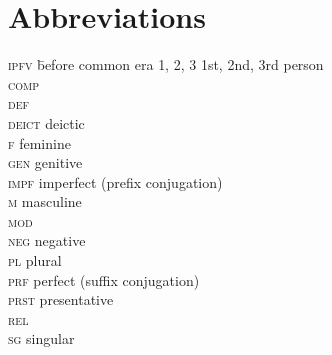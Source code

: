 \documentclass[output=paper]{langsci/langscibook}
\begin{document}
\section*{Abbreviations}
\setlength{\columnsep}{30pt}
\begin{multicols}{2}
\begin{tabbing}
\textsc{ipfv} \hspace{1em} \= before common era\kill
\textsc{1, 2, 3} \> 1st, 2nd, 3rd person \\
\textsc{comp} \>  \\
\textsc{def} \>  \\
\textsc{deict} \> deictic \\
\textsc{f} \> feminine \\
\textsc{gen} \> genitive \\
\textsc{impf} \> imperfect (prefix conjugation) \\
\textsc{m} \> masculine \\
\textsc{mod} \>  \\
\textsc{neg} \> negative \\
\textsc{pl} \> plural \\
\textsc{prf} \> perfect (suffix conjugation) \\
\textsc{prst} \> presentative \\
\textsc{rel} \>  \\
\textsc{sg} \> singular
\end{tabbing}
\end{multicols}


\sloppy
\printbibliography[heading=subbibliography,notkeyword=this]
\end{document}
